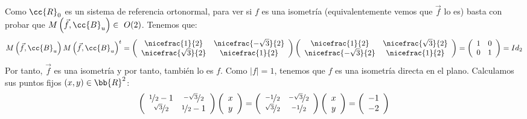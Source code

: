 \begin{ejercicio}
\begin{enumerate}
        Como $\cc{R}_0$ es un sistema de referencia ortonormal, para ver si $f$ es una isometría (equivalentemente vemos que $\vec{f}$ lo es) basta con probar que $M\left(\vec{f}, \cc{B}_u\right)\in~O(2)$. Tenemos que:
        \begin{equation*}
            M\left(\vec{f},\cc{B}_u\right)M\left(\vec{f},\cc{B}_u\right)^t
            = 
            \left(
            \begin{array}{cc}
                \nicefrac{1}{2} & \nicefrac{-\sqrt{3}}{2} \\
                \nicefrac{\sqrt{3}}{2} & \nicefrac{1}{2}
            \end{array}
            \right)
            \left(
            \begin{array}{cc}
                \nicefrac{1}{2} & \nicefrac{\sqrt{3}}{2} \\
                \nicefrac{-\sqrt{3}}{2} & \nicefrac{1}{2}
            \end{array}
            \right)
            = 
            \left(
            \begin{array}{cc}
                1 & 0 \\
                0 & 1 \\
            \end{array}
            \right) = Id_2
        \end{equation*}
        Por tanto, $\vec{f}$ es una isometría y por tanto, también lo es $f$. Como $|f|=1$, tenemos que $f$ es una isometría directa en el plano. Calculamos sus puntos fijos $(x,y)\in \bb{R}^2$:
        \begin{equation*}
            \left(
            \begin{array}{cc}
                \nicefrac{1}{2}-1 & \nicefrac{-\sqrt{3}}{2} \\
                \nicefrac{\sqrt{3}}{2} & \nicefrac{1}{2}-1
            \end{array}
            \right)
            \left(
            \begin{array}{c}
                x\\y
            \end{array}
            \right)
            =\left(
            \begin{array}{cc}
                \nicefrac{-1}{2} & \nicefrac{-\sqrt{3}}{2} \\
                \nicefrac{\sqrt{3}}{2} & \nicefrac{-1}{2}
            \end{array}
            \right)
            \left(
            \begin{array}{c}
                x\\y
            \end{array}
            \right)
            = \left(
            \begin{array}{c}
                -1\\-2
            \end{array}
            \right)
        \end{equation*}


\end{enumerate}
\end{ejercicio}
